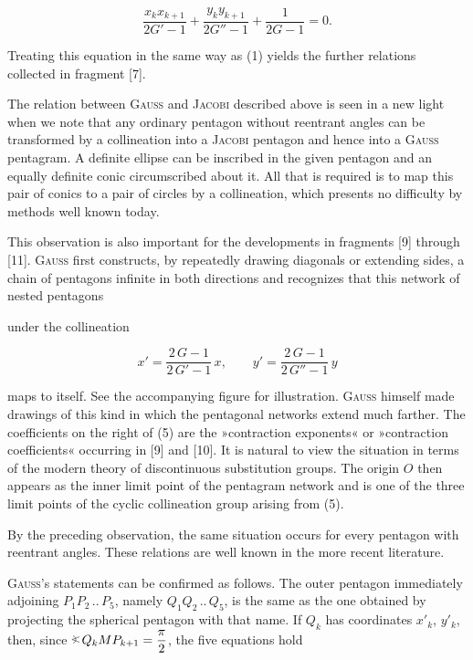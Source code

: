 \[
\dfrac{x_kx_{k+1}}{2G'-1} + \dfrac{y_ky_{k+1}}{2G''-1} + \dfrac{1}{2G-1} = 0.\tag{4}
\]

Treating this equation in the same way as (1) yields the further relations collected in
fragment [7].

The relation between \textsc{Gauss} and \textsc{Jacobi} described above is seen in a new
light when we note that any ordinary pentagon without
reentrant angles can be transformed by a collineation into a \textsc{Jacobi} pentagon and hence into a \textsc{Gauss}
pentagram. A definite ellipse can be inscribed in the given pentagon and
an equally definite conic circumscribed about it. All that is required
is to map this pair of conics to a pair of circles by a collineation, which presents no
difficulty by methods well known today.

This observation is also important for the developments in fragments [9] through [11].
\textsc{Gauss} first constructs, by repeatedly drawing diagonals or extending sides,
a chain of pentagons infinite in both
directions and recognizes that this network of nested pentagons

\begin{center}\end{center}

under the collineation

\[
x' = \dfrac{2\,G-1}{2\,G'-1}\,x, \qquad y' = \dfrac{2\,G-1}{2\,G''-1}\,y\tag{5}
\]

maps to itself. See the accompanying figure for illustration. \textsc{Gauss} himself made drawings of this kind in which the pentagonal networks extend much farther. The coefficients on the right of (5) are the »contraction exponents« or »contraction coefficients« occurring in [9] and [10]. It is natural to view the situation in terms of the modern theory of discontinuous substitution groups. The origin $O$ then appears as the inner limit point of the pentagram network and is one of the three limit points of the cyclic collineation group arising from (5).

By the preceding observation, the same situation occurs for every pentagon with reentrant angles. These relations are well known in the more recent literature.

\textsc{Gauss}'s statements can be confirmed as follows. The outer pentagon immediately adjoining $P_1P_2\,..\,P_5$, namely $Q_1Q_2\,..\,Q_5$, is the same as the one obtained by projecting the spherical pentagon with that name. If $Q_k$ has coordinates $x'_k$, $y'_k$, then, since $\HistAngle\,Q_kMP_{k+1} = \dfrac{\pi}{2}$, the five equations hold

